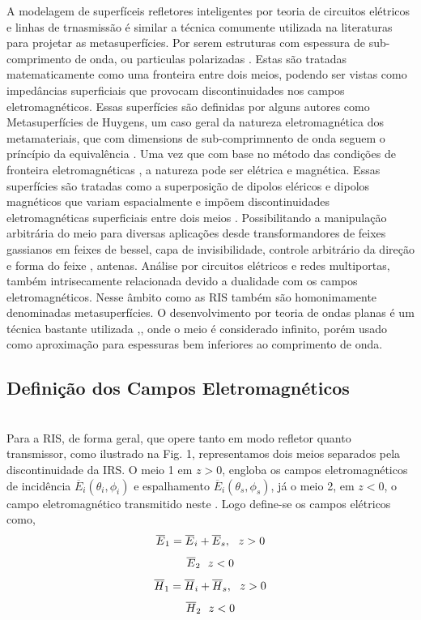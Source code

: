 \documentclass[
	12pt,				%
	openright,			%
	oneside,			%
	a4paper,			%
	english,			%
	brazil				%
	]{abntex2}
\begin{document}
A modelagem de superfíceis refletores inteligentes por teoria de circuitos elétricos e linhas de trnasmissão é similar a técnica comumente utilizada na literaturas para projetar as metasuperfícies. Por serem estruturas com espessura de sub-comprimento de onda, ou particulas polarizadas . Estas são tratadas matematicamente como uma fronteira entre dois meios, podendo ser vistas como impedâncias superficiais que provocam discontinuidades nos campos eletromagnéticos. Essas superfícies são definidas por alguns autores como Metasuperfícies de Huygens, um caso geral da natureza eletromagnética dos metamateriais, que com dimensions de sub-comprimnento de onda seguem o príncípio da equivalência  \cite{BalanisAEM}. Uma vez que com base no método das condições de fronteira eletromagnéticas , a natureza pode ser elétrica e magnética. Essas superfícies são tratadas como a superposição de dipolos eléricos e dipolos magnéticos que variam espacialmente e impõem discontinuidades eletromagnéticas superficiais entre dois meios \cite{GSTC}. Possibilitando a manipulação arbitrária do meio para diversas aplicações desde transformandores de feixes gassianos em feixes de bessel, capa de invisibilidade, controle arbitrário da direção e forma do feixe , antenas. Análise por circuitos elétricos e redes multiportas, também intrisecamente relacionada devido a dualidade com os campos eletromagnéticos.
Nesse âmbito como as RIS também são homonimamente denominadas metasuperfícies. O desenvolvimento por teoria de ondas planas é um técnica bastante utilizada \cite{BalanisAEM},\cite{EMPWTL}, onde o meio é considerado infinito, porém usado como aproximação para espessuras bem inferiores ao comprimento de onda.


\subsection{Definição dos Campos Eletromagnéticos}
\\
Para a RIS, de forma geral, que opere tanto em modo refletor quanto transmissor, como ilustrado na Fig. 1, representamos dois meios separados pela discontinuidade da IRS. O meio 1 em $z>0$, engloba os campos eletromagnéticos de incidência $\overline{E}_{i}(\theta_i,\phi_i)$ e espalhamento $\overline{E}_{i}(\theta_s,\phi_s)$, já o meio 2, em $z<0$, o campo eletromagnético transmitido neste . Logo define-se os campos elétricos como,\\
\begin{equation}
      \overline{E}_{1}=\overline{E}_{i}
      +\overline{E}_{s}, \ \ z > 0\\
\end{equation}
\begin{equation}
       \overline{E}_{2} \   \ z < 0 \\
\end{equation}
\begin{equation}
      \overline{H}_{1}=\overline{H}_{i}
      +\overline{H}_{s}, \ \ z > 0\\
\end{equation}
\begin{equation}
       \overline{H}_{2}\   \ z < 0 \\
\end{equation}
\end{document}
